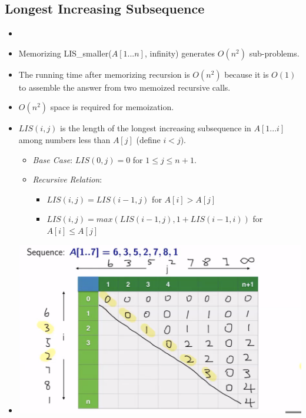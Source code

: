 \documentclass[12pt]{article}
\begin{document}
\subsection{Longest Increasing Subsequence}
\begin{itemize}
    \item[] 
    \item Memorizing LIS\_smaller($A[1...n]$, infinity) generates $O(n^2)$ sub-problems.
    \item The running time after memorizing recursion is $O(n^2)$ because it is $O(1)$ to assemble the answer from two memoized recursive calls.
    \item $O(n^2)$ space is required for memoization.
    \item $LIS(i, j)$ is the length of the longest increasing subsequence in $A[1...i]$ among numbers less than $A[j]$ (define $i < j$).
    \begin{itemize}
        \item \textit{Base Case}: $LIS(0, j) = 0$ for $1 \leq j \leq n + 1$.
        \item \textit{Recursive Relation}:
        \begin{itemize}
            \item $LIS(i, j) = LIS(i - 1, j)$ for $A[i] > A[j]$
            \item $LIS(i, j) = max(LIS(i - 1, j), 1 + LIS(i - 1, i))$ for $A[i] \leq A[j]$
        \end{itemize}
    \end{itemize}
    \item[] \includegraphics[width=\textwidth]{images/lis-memo.png}
\end{itemize}
\end{document}
